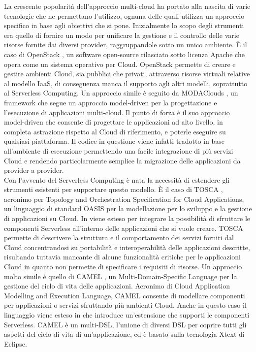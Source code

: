La crescente popolarità dell’approccio multi-cloud ha portato alla nascita di varie tecnologie che ne permettano l’utilizzo, ognuna delle quali utilizza un approccio specifico in base agli obiettivi che si pone. Inizialmente lo scopo degli strumenti era quello di fornire un modo per unificare la gestione e il controllo delle varie risorse fornite dai diversi provider, raggruppandole sotto un unico ambiente. È il caso di OpenStack \cite{OpenStack}, un software open-source rilasciato sotto licenza Apache che opera come un sistema operativo per Cloud. OpenStack permette di creare e gestire ambienti Cloud, sia pubblici che privati, attraverso risorse virtuali relative al modello IaaS, di conseguenza manca il supporto agli altri modelli, soprattutto al Serverless Computing. Un approccio simile è seguito da MODAClouds \cite{MODAClouds}, un framework che segue un approccio model-driven per la progettazione e l’esecuzione di applicazioni multi-cloud. Il punto di forza è il suo approccio model-driven che consente di progettare le applicazioni ad alto livello, in completa astrazione rispetto al Cloud di riferimento, e poterle eseguire su qualsiasi piattaforma. Il codice in questione viene infatti tradotto in base all’ambiente di esecuzione permettendo una facile integrazione di più servizi Cloud e rendendo particolarmente semplice la migrazione delle applicazioni da provider a provider. \\
Con l’avvento del Serverless Computing è nata la necessità di estendere gli strumenti esistenti per supportare questo modello. È il caso di TOSCA \cite{TOSCASite}, acronimo per
Topology and Orchestration Specification for Cloud Applications, un linguaggio di standard OASIS per la modellazione per lo sviluppo e la gestione di applicazioni su Cloud. In \citet{TOSCAServerless} viene esteso per integrare la possibilità di sfruttare le componenti Serverless all’interno delle applicazioni che si vuole creare. TOSCA permette di descrivere la struttura e il comportamento dei servizi forniti dal Cloud concentrandosi su portabilità e interoperabilità delle applicazioni descritte, risultando tuttavia mancante di alcune funzionalità critiche per le applicazioni Cloud in quanto non permette di specificare i requisiti di risorse. Un approccio molto simile è quello di CAMEL \cite{CAMELSite}, un Multi-Domain-Specific Language per la gestione del ciclo di vita delle applicazioni. Acronimo di Cloud Application Modelling and Execution Language, CAMEL consente di modellare componenti per applicazioni o servizi sfruttando più ambienti Cloud. Anche in questo caso il linguaggio viene esteso in \citet{@ServerlessCamel} che introduce un’estensione che supporti le componenti Serverless. CAMEL è un multi-DSL, l’unione di diversi DSL per coprire tutti gli aspetti del ciclo di vita di un’applicazione, ed è basato sulla tecnologia Xtext di Eclipse.
